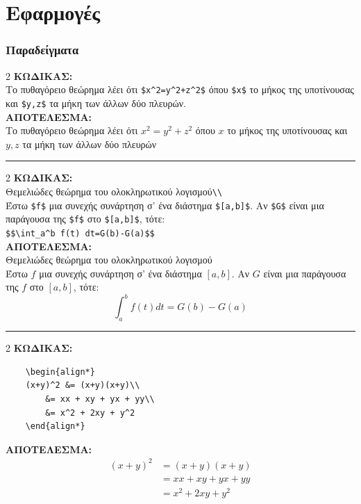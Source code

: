 \documentclass[a4paper, 12pt, oneside, xelatex, final]{article}
\begin{document}
\part{Εφαρμογές}

\section{Παραδείγματα}
\vspace*{-1ex}
\label{Examples}
	\begin{multicols}{2}
	\noindent \label{example1}
	\textbf{ΚΩΔΙΚΑΣ:}\\
	Το πυθαγόρειο θεώρημα λέει ότι \verb|$x^2=y^2+z^2$| όπου \verb+$x$+ το μήκος της υποτίνουσας και \verb+$y,z$+ τα μήκη των άλλων δύο πλευρών.
	\columnbreak
	\phantom{.}\hfill\\ \textbf{ΑΠΟΤΕΛΕΣΜΑ:}\\
	Το πυθαγόρειο θεώρημα λέει ότι $x^2=y^2+z^2$ όπου $x$ το μήκος της υποτίνουσας και $y,z$ τα μήκη των άλλων δύο πλευρών
	\end{multicols}
	\hrule\vspace*{-1ex}
	\begin{multicols}{2}
	\noindent \label{example2}
	\textbf{ΚΩΔΙΚΑΣ:}\\
	Θεμελιώδες θεώρημα του ολοκληρωτικού λογισμού\verb+\\+ \\
	Έστω \verb+$f$+ μια συνεχής συνάρτηση σ’ ένα διάστημα \verb+$[a,b]$+. Αν \verb+$G$+ είναι μια παράγουσα της \verb+$f$+ στο \verb+$[a,b]$+, τότε:\\
	\verb+$$\int_a^b f(t) dt=G(b)-G(a)$$+
	\columnbreak
	\hfill\\
	\textbf{ΑΠΟΤΕΛΕΣΜΑ:}\\
	Θεμελιώδες θεώρημα του ολοκληρωτικού λογισμού\\
	Έστω $f$ μια συνεχής συνάρτηση σ’ ένα διάστημα $[a,b]$. Αν $G$ είναι μια παράγουσα της $f$ στο $[a,b]$, τότε:
	$$\int_a^b f(t) dt=G(b)-G(a)$$
	\end{multicols}
	\hrule\vspace*{-1ex}
	\begin{multicols}{2}
	\noindent \label{example3}
	\textbf{ΚΩΔΙΚΑΣ:}
	\begin{verbatim}
	\begin{align*}
	(x+y)^2 &= (x+y)(x+y)\\
        &= xx + xy + yx + yy\\
        &= x^2 + 2xy + y^2
	\end{align*}
	\end{verbatim}
	\columnbreak
	\phantom{.}\hspace{5em}\textbf{ΑΠΟΤΕΛΕΣΜΑ:}\\[-.9cm]
	\begin{align*}
	(x+y)^2 &= (x+y)(x+y)\\
          &= xx + xy + yx + yy\\
          &= x^2 + 2xy + y^2
	\end{align*}
	\end{multicols}
\end{document}
